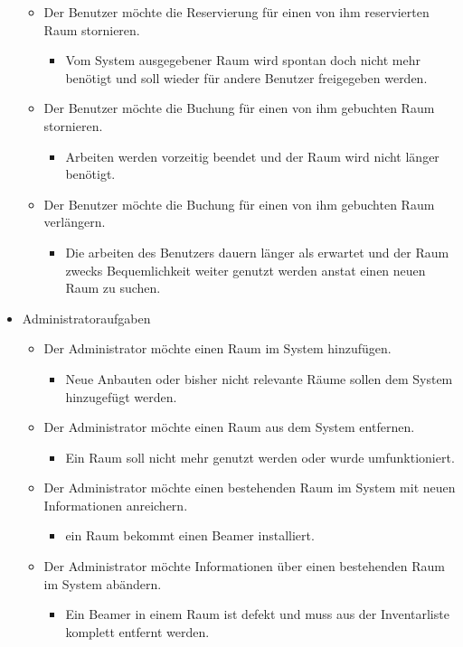 \begin{itemize}
\begin{itemize}[noitemsep]
\begin{itemize}
		\end{itemize}
		\item Der Benutzer möchte die Reservierung für einen von ihm reservierten Raum stornieren.
		\begin{itemize}
			\item Vom System ausgegebener Raum wird spontan doch nicht mehr benötigt und soll wieder für andere Benutzer freigegeben werden.
		\end{itemize}
		\item Der Benutzer möchte die Buchung für einen von ihm gebuchten Raum stornieren.
		\begin{itemize}
			\item Arbeiten werden vorzeitig beendet und der Raum wird nicht länger benötigt.
		\end{itemize}
		\item Der Benutzer möchte die Buchung für einen von ihm gebuchten Raum verlängern.
		\begin{itemize}
			\item Die arbeiten des Benutzers dauern länger als erwartet und der Raum zwecks Bequemlichkeit weiter genutzt werden anstat einen neuen Raum zu suchen.
		\end{itemize}
		
	\end{itemize}
	\item Administratoraufgaben
	\begin{itemize}[noitemsep]
		\item Der Administrator möchte einen Raum im System hinzufügen.
		\begin{itemize}
			\item Neue Anbauten oder bisher nicht relevante Räume sollen dem System hinzugefügt werden.
		\end{itemize}
		\item Der Administrator möchte einen Raum aus dem System entfernen.
		\begin{itemize}
			\item Ein Raum soll nicht mehr genutzt werden oder wurde umfunktioniert.
		\end{itemize}
		\item Der Administrator möchte einen bestehenden Raum im System mit neuen Informationen anreichern.
		\begin{itemize}
			\item \Bspw ein Raum bekommt einen Beamer installiert.
		\end{itemize}
		\item Der Administrator möchte Informationen über einen bestehenden Raum im System abändern.
		\begin{itemize}
			\item Ein Beamer in einem Raum ist defekt und muss aus der Inventarliste komplett entfernt werden.
		\end{itemize}
	\end{itemize}
\end{itemize}
\clearpage

